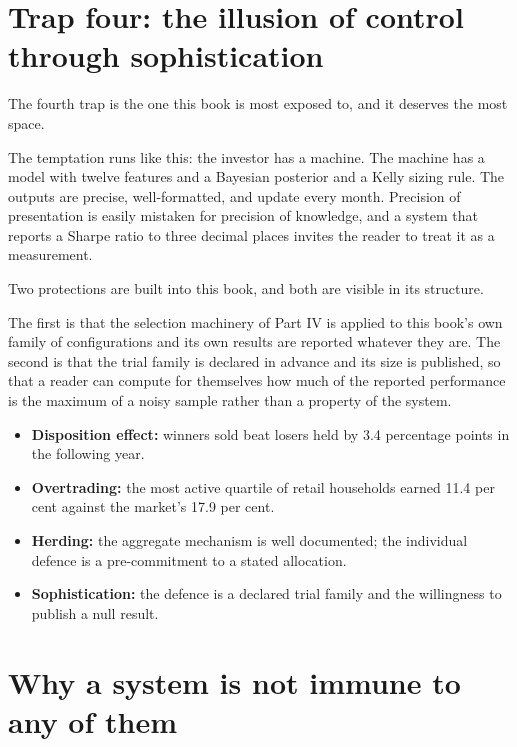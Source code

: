 \section{Trap four: the illusion of control through sophistication}

The fourth trap is the one this book is most exposed to, and it deserves
the most space.

The temptation runs like this: the investor has a machine. The machine has
a model with twelve features and a Bayesian posterior and a Kelly sizing
rule. The outputs are precise, well-formatted, and update every month.
Precision of presentation is easily mistaken for precision of knowledge,
and a system that reports a Sharpe ratio to three decimal places invites
the reader to treat it as a measurement.

Two protections are built into this book, and both are visible in its
structure.

The first is that the selection machinery of Part IV is applied to this
book's own family of configurations and its own results are reported
whatever they are. The second is that the trial family is declared in
advance and its size is published, so that a reader can compute for
themselves how much of the reported performance is the maximum of a noisy
sample rather than a property of the system.

\begin{takeaway}
\begin{itemize}
\item \textbf{Disposition effect:} winners sold beat losers held by 3.4
percentage points in the following year.
\item \textbf{Overtrading:} the most active quartile of retail households
earned 11.4 per cent against the market's 17.9 per cent.
\item \textbf{Herding:} the aggregate mechanism is well documented; the
individual defence is a pre-commitment to a stated allocation.
\item \textbf{Sophistication:} the defence is a declared trial family and
the willingness to publish a null result.
\end{itemize}
\end{takeaway}

\section{Why a system is not immune to any of them}

